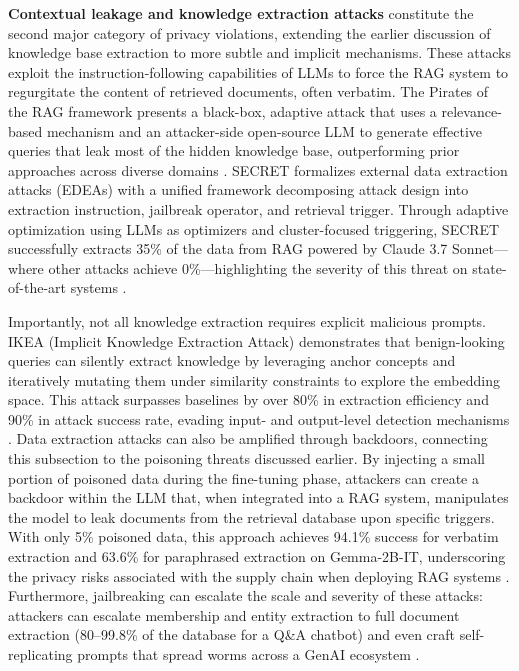 \documentclass[11pt]{article}
\begin{document}
\textbf{Contextual leakage and knowledge extraction attacks} constitute the second major category of privacy violations, extending the earlier discussion of knowledge base extraction to more subtle and implicit mechanisms. These attacks exploit the instruction-following capabilities of LLMs to force the RAG system to regurgitate the content of retrieved documents, often verbatim. The Pirates of the RAG framework presents a black-box, adaptive attack that uses a relevance-based mechanism and an attacker-side open-source LLM to generate effective queries that leak most of the hidden knowledge base, outperforming prior approaches across diverse domains \cite{ref465}. SECRET formalizes external data extraction attacks (EDEAs) with a unified framework decomposing attack design into extraction instruction, jailbreak operator, and retrieval trigger. Through adaptive optimization using LLMs as optimizers and cluster-focused triggering, SECRET successfully extracts 35\% of the data from RAG powered by Claude 3.7 Sonnet---where other attacks achieve 0\%---highlighting the severity of this threat on state-of-the-art systems \cite{ref481}.

Importantly, not all knowledge extraction requires explicit malicious prompts. IKEA (Implicit Knowledge Extraction Attack) demonstrates that benign-looking queries can silently extract knowledge by leveraging anchor concepts and iteratively mutating them under similarity constraints to explore the embedding space. This attack surpasses baselines by over 80\% in extraction efficiency and 90\% in attack success rate, evading input- and output-level detection mechanisms \cite{ref482}. Data extraction attacks can also be amplified through backdoors, connecting this subsection to the poisoning threats discussed earlier. By injecting a small portion of poisoned data during the fine-tuning phase, attackers can create a backdoor within the LLM that, when integrated into a RAG system, manipulates the model to leak documents from the retrieval database upon specific triggers. With only 5\% poisoned data, this approach achieves 94.1\% success for verbatim extraction and 63.6\% for paraphrased extraction on Gemma-2B-IT, underscoring the privacy risks associated with the supply chain when deploying RAG systems \cite{ref463}. Furthermore, jailbreaking can escalate the scale and severity of these attacks: attackers can escalate membership and entity extraction to full document extraction (80--99.8\% of the database for a Q\&A chatbot) and even craft self-replicating prompts that spread worms across a GenAI ecosystem \cite{ref483}.
\end{document}
